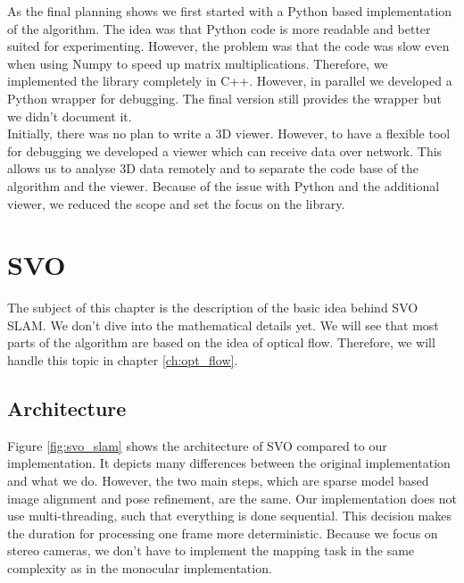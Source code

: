 \documentclass[11pt,a4paper,titlepage,oneside]{report}
\begin{document}
As the final planning shows we first started with a Python based implementation of the algorithm. The idea was that Python code is more readable and better suited for experimenting. However, the problem was that the code was slow even when using Numpy to speed up matrix multiplications. Therefore, we implemented the library completely in C++. However, in parallel we developed a Python wrapper for debugging. The final version still provides the wrapper but we didn't document it.\\
Initially, there was no plan to write a 3D viewer. However, to have a flexible tool for debugging we developed a viewer which can receive data over network. This allows us to analyse 3D data remotely and to separate the code base of the algorithm and the viewer. Because of the issue with Python and the additional viewer, we reduced the scope and set the focus on the library.

\chapter{SVO}\label{ch:svo}
The subject of this chapter is the description of the basic idea behind SVO SLAM. We don't dive into the mathematical details yet. We will see that most parts of the algorithm are based on the idea of optical flow. Therefore, we will handle this topic in chapter \ref{ch:opt_flow}.

\section{Architecture}

Figure \ref{fig:svo_slam} shows the architecture of SVO compared to our implementation. It depicts many differences between the original implementation and what we do. However, the two main steps, which are sparse model based image alignment and pose refinement, are the same. Our implementation does not use multi-threading, such that everything is done sequential. This decision makes the duration for processing one frame more deterministic. Because we focus on stereo cameras, we don't have to implement the mapping task in the same complexity as in the monocular implementation.
\end{document}
